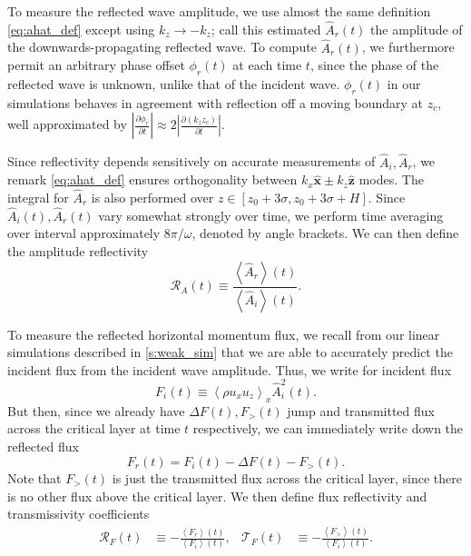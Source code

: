 \documentclass[
        fleqn,
        usenatbib,
    ]{mnras}
\newcommand*{\pd}[2]{\frac{\partial#1}{\partial#2}}
\newcommand*{\abs}[1]{\left|#1\right|}
\newcommand*{\ev}[1]{\left\langle#1\right\rangle}
\newcommand*{\uv}[1]{\hat{\mathbf{#1}}}
\begin{document}
To measure the reflected wave amplitude, we use almost the same definition
\autoref{eq:ahat_def} except using $k_{z} \to -k_{z}$; call this estimated
$\hat{A}_r(t)$ the amplitude of the downwards-propagating reflected wave. To
compute $\hat{A}_r(t)$, we furthermore permit an arbitrary phase offset
$\phi_r(t)$ at each time $t$, since the phase of the reflected wave is unknown,
unlike that of the incident wave. $\phi_r(t)$ in our simulations
behaves in agreement with reflection off a moving boundary at $z_c$,
well approximated by $\abs{\pd{\phi_r}{t}} \approx 2\abs{\pd{(k_{z}z_c)}{t}}$.

Since reflectivity depends sensitively on accurate measurements of $\hat{A}_i,
\hat{A}_r$, we remark \autoref{eq:ahat_def} ensures orthogonality between
$k_{x}\uv{x} \pm k_{z}\uv{z}$ modes. The integral for $\hat{A}_r$ is also
performed over $z \in [z_0 + 3\sigma, z_0 + 3\sigma + H]$. Since
$\hat{A}_i(t), \hat{A}_r(t)$ vary somewhat strongly over time, we perform time
averaging over interval approximately $8\pi/\omega$, denoted by angle brackets.
We can then define the amplitude reflectivity
\begin{equation}
    \mathcal{R}_A(t) \equiv \frac{\ev{\hat{A}_r}(t)}{\ev{\hat{A}_i}(t)}
        .\label{eq:Ra_def}
\end{equation}

To measure the reflected horizontal momentum flux, we recall from our linear
simulations described in \autoref{s:weak_sim} that we are able to accurately
predict the incident flux from the incident wave amplitude. Thus, we write for
incident flux
\begin{equation}
    F_i(t) \equiv \ev{\rho u_{x} u_{z}}_x\hat{A}_i^2(t).
\end{equation}
But then, since we already have $\Delta F(t), F_>(t)$ jump and transmitted flux
across the critical layer at time $t$ respectively, we can immediately write
down the reflected flux
\begin{equation}
    F_r(t) = F_i(t) - \Delta F(t) - F_>(t).
\end{equation}
Note that $F_>(t)$ is just the transmitted flux across the critical layer, since
there is no other flux above the critical layer. We then define flux
reflectivity and transmissivity coefficients
\begin{align}
    \mathcal{R}_F(t) &\equiv -\frac{\ev{F_r}(t)}{\ev{F_i}(t)},&
    \mathcal{T}_F(t) &\equiv -\frac{\ev{F_>}(t)}{\ev{F_i}(t)}.
        \label{eq:srefl_def}
\end{align}
\end{document}
